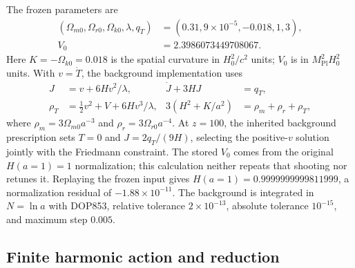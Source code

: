 The frozen parameters are
\begin{equation}
 \begin{split}
 (\Omega_{m0},\Omega_{r0},\Omega_{k0},\lambda,q_T)
 &=(0.31,9\times10^{-5},-0.018,1,3),\\
 V_0&=2.3986073449708067 .
 \end{split}
 \label{eq:app-background-parameters}
\end{equation}
Here $K=-\Omega_{k0}=0.018$ is the spatial curvature in $H_0^2/c^2$ units;
$V_0$ is in $M_{\mathrm{Pl}}^2H_0^2$ units.  With $v=\dot T$, the background
implementation uses
\begin{align}
 J&=v+6Hv^2/\lambda, & \dot J+3HJ&=q_T,\nonumber\\
 \rho_T&=\tfrac12v^2+V+6Hv^3/\lambda,
 &3(H^2+K/a^2)&=\rho_m+\rho_r+\rho_T ,
 \label{eq:app-background-equations}
\end{align}
where $\rho_m=3\Omega_{m0}a^{-3}$ and
$\rho_r=3\Omega_{r0}a^{-4}$.  At $z=100$, the inherited background
prescription sets $T=0$ and $J=2q_T/(9H)$, selecting the positive-$v$
solution jointly with the Friedmann constraint.  The stored $V_0$ comes
from the original $H(a=1)=1$ normalization; this calculation neither repeats
that shooting nor retunes it.  Replaying the frozen input gives
$H(a=1)=0.9999999999811999$, a normalization residual of
$-1.88\times10^{-11}$.
The background is integrated in $N=\ln a$ with DOP853, relative tolerance
$2\times10^{-13}$, absolute tolerance $10^{-15}$, and maximum step $0.005$.

\subsection{Finite harmonic action and reduction}

